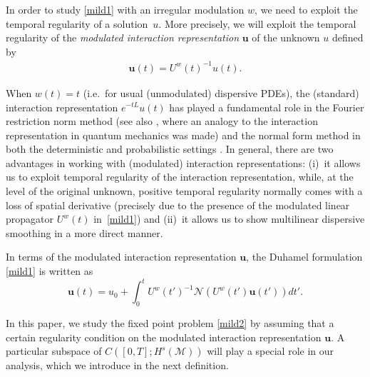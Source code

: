 \documentclass[letterpaper, 11pt,  reqno]{amsart}
\newcommand{\1}{\hspace{0.5mm}\text{I}\hspace{0.5mm}}
\newcommand{\noi}{\noindent}
\newcommand{\M}{\mathcal{M}}
\newcommand{\NN}{\mathcal{N}}
\newcommand{\uw}{U^w}
\newcommand{\uu}{\mathbf{u}}
\numberwithin{equation}{section}
\numberwithin{theorem}{section}
\begin{document}
In order to study \eqref{mild1} with an irregular modulation $w$, 
we  need to exploit the temporal regularity of a solution~$u$.
More precisely, 
we will exploit the temporal regularity 
of the 
{\it modulated interaction representation} 
$\uu$ of the unknown $u$ defined by 
\begin{align}
\uu(t)=\uw(t)^{-1}u(t).
\label{int1} 
\end{align}

\noi
When $w(t) = t$
(i.e.~for usual (unmodulated) dispersive PDEs), the (standard) interaction representation $e^{-tL} u(t)$
has played a fundamental  role
in the Fourier restriction norm method
\cite{BO93, KT}
(see also \cite{GTV}, 
where an analogy
to the 
 interaction representation in quantum mechanics was made)
 and the normal form method 
 in both the deterministic and probabilistic settings
 \cite{BIT, KO, GKO, OTz, OST, OW}.
In general, there are two advantages
in working with (modulated) interaction representations:
(i)~it allows us to exploit temporal regularity of
the interaction representation,
while, at the level of the original unknown, positive temporal regularity normally comes 
with a loss of spatial derivative
(precisely due to 
the presence of 
the modulated linear propagator
$U^w(t)$
 in~\eqref{mild1})
 and 
(ii)~it allows us to show multilinear dispersive smoothing 
in a more direct manner.




In terms of the modulated interaction representation $\uu$, 
the Duhamel formulation \eqref{mild1}
is written as 
\begin{equation}
\uu(t) = u_0 + \int_0 ^t \uw(t')^{-1}\NN(\uw(t') \uu(t'))dt'.
\label{mild2}
\end{equation}


\noi
In this paper, we study the fixed point problem \eqref{mild2}
by assuming that a certain regularity condition 
on 
the modulated interaction representation $\uu$.
A particular subspace of $C([0,T];H^s(\M))$ will play a special role in our analysis, 
which we introduce in the next definition. 
\end{document}

